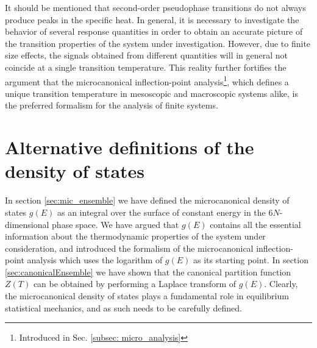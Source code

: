\documentclass[12pt]{report}
\begin{document}
It should be mentioned that second-order pseudophase transitions do not always produce peaks in the specific heat. In general, it is necessary to investigate the behavior of several response quantities in order to obtain an accurate picture of the transition properties of the system under investigation. However, due to finite size effects, the signals obtained from different quantities will in general not coincide at a single transition temperature. This reality further fortifies the argument that the microcanonical inflection-point analysis\footnote{Introduced in Sec. \ref{subsec: micro_analysis}}, which defines a unique transition temperature in mesoscopic and macroscopic systems alike, is the preferred formalism for the analysis of finite systems.
\newpage

\section{Alternative definitions of the density of states}
In section \ref{sec:mic_ensemble} we have defined the microcanonical density of states $g(E)$ as an integral over the surface of constant energy in the $6N$-dimensional phase space. We have argued that $g(E)$ contains all the essential information about the thermodynamic properties of the system under consideration, and introduced the formalism of the microcanonical inflection-point analysis which uses the logarithm of $g(E)$ as its starting point. In section \ref{sec:canonicalEnsemble} we have shown that the canonical partition function $Z(T)$ can be obtained by performing a Laplace transform of $g(E)$. Clearly, the microcanonical density of states plays a fundamental role in equilibrium statistical mechanics, and as such needs to be carefully defined. 
\end{document}
